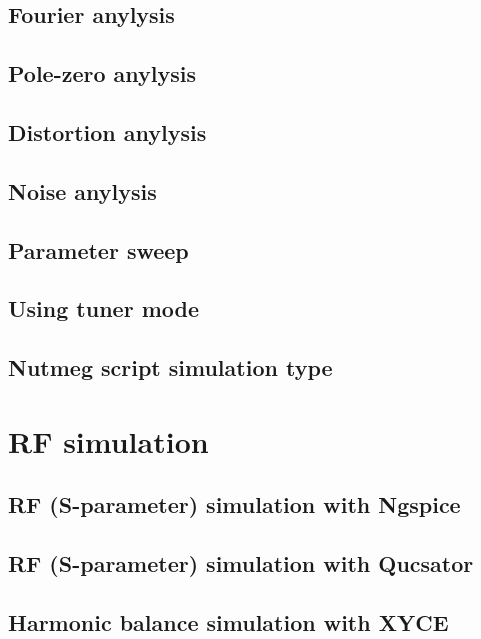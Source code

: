 \documentclass[a4paper,12pt]{article}
\begin{document}
\subsection{Fourier anylysis}

\subsection{Pole-zero anylysis}

\subsection{Distortion anylysis}

\subsection{Noise anylysis}

\subsection{Parameter sweep}

\subsection{Using tuner mode}

\subsection{Nutmeg script simulation type}

\section{RF simulation}

\subsection{RF (S-parameter) simulation with Ngspice}

\subsection{RF (S-parameter) simulation with Qucsator}

\subsection{Harmonic balance simulation with XYCE}
\end{document}
